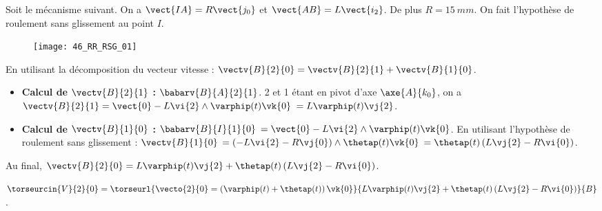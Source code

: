 \normalfalse \difficiletrue \tdifficilefalse
\correctiontrue


\setcounter{question}{0}%
\ifcorrection
\else
{}
\fi

\ifprof
\else
Soit le mécanisme suivant. On a $\vect{IA}=R\vect{j_0}$ et $\vect{AB}=L\vect{i_2}$. De plus $R=\SI{15}{mm}$. On fait l'hypothèse de roulement sans glissement au point $I$.
\begin{figure}[!h]
\texttt{[image: 46\_RR\_RSG\_01]}
\end{figure}
\fi



\ifprof
En utilisant la décomposition du vecteur vitesse : 
$\vectv{B}{2}{0} = \vectv{B}{2}{1} +  \vectv{B}{1}{0}$.

\begin{itemize}
\item \textbf{Calcul de $ \vectv{B}{2}{1}$ :}  $\babarv{B}{A}{2}{1}$. 2 et 1 étant en pivot d'axe $\axe{A}{k_0}$, on a $\vectv{B}{2}{1}=\vect{0}-L\vi{2}\wedge \varphip(t)\vk{0}$
$=L\varphip(t)\vj{2}$.
\item \textbf{Calcul de $ \vectv{B}{1}{0}$ :}  $\babarv{B}{I}{1}{0}$ 
$=\vect{0}-L\vi{2}\wedge \varphip(t)\vk{0}$. En utilisant l'hypothèse de roulement sans glissement : $ \vectv{B}{1}{0}$  $=\left(-L\vi{2}-R\vj{0}\right)\wedge \thetap(t)\vk{0}$  $=\thetap(t)\left(L\vj{2}-R\vi{0}\right)$.
\end{itemize}

Au final, $\vectv{B}{2}{0} = L\varphip(t)\vj{2} +\thetap(t)\left(L\vj{2}-R\vi{0}\right) $.


\else
\fi


\ifprof
 $\torseurcin{V}{2}{0} = \torseurl{\vecto{2}{0}=\left( \varphip(t)+\thetap(t) \right) \vk{0} }{ L\varphip(t)\vj{2} +\thetap(t)\left(L\vj{2}-R\vi{0}\right)}{B}$.
 

\else
\fi


